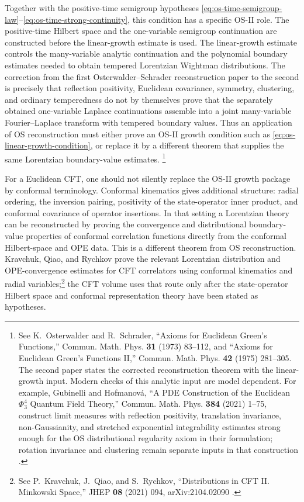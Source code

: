 Together with the positive-time semigroup hypotheses
\eqref{eq:os-time-semigroup-law}--\eqref{eq:os-time-strong-continuity}, this
condition has a specific OS-II role.  The positive-time Hilbert space and the
one-variable semigroup continuation are constructed before the linear-growth
estimate is used.  The linear-growth estimate controls the many-variable
analytic continuation and the polynomial boundary estimates needed to obtain
tempered Lorentzian Wightman distributions.  The correction from the first
Osterwalder--Schrader reconstruction paper to the second is precisely that
reflection positivity, Euclidean covariance, symmetry, clustering, and ordinary
temperedness do not by themselves prove that the separately obtained
one-variable Laplace continuations assemble into a joint many-variable
Fourier--Laplace transform with tempered boundary values.
Thus an application of OS reconstruction must either prove an OS-II growth
condition such as \eqref{eq:os-linear-growth-condition}, or replace it by a
different theorem that supplies the same Lorentzian boundary-value estimates.
\footnote{See K.~Osterwalder and R.~Schrader, ``Axioms for Euclidean Green's
Functions,'' Commun. Math. Phys. \textbf{31} (1973) 83--112, and ``Axioms for
Euclidean Green's Functions II,'' Commun. Math. Phys. \textbf{42} (1975)
281--305.  The second paper states the corrected reconstruction theorem with
the linear-growth input.  Modern checks of this analytic input are model
dependent.  For example, Gubinelli and Hofmanov\'a, ``A PDE Construction of
the Euclidean \(\Phi^4_3\) Quantum Field Theory,'' Commun. Math. Phys.
\textbf{384} (2021) 1--75, construct limit measures with reflection
positivity, translation invariance, non-Gaussianity, and stretched exponential
integrability estimates strong enough for the OS distributional regularity
axiom in their formulation; rotation invariance and clustering remain separate
inputs in that construction \cite{OS1973,OS1975,GubinelliHofmanova2021}.}

\begin{remark}
For a Euclidean CFT, one should not silently replace the OS-II growth package
by conformal terminology.  Conformal kinematics gives additional structure:
radial ordering, the inversion pairing, positivity of the state-operator
inner product, and conformal covariance of operator insertions.  In that
setting a Lorentzian theory can be reconstructed by proving the convergence
and distributional boundary-value properties of conformal correlation
functions directly from the conformal Hilbert-space and OPE data.  This is a
different theorem from OS reconstruction.  Kravchuk, Qiao, and Rychkov prove
the relevant Lorentzian distribution and OPE-convergence estimates for CFT
correlators using conformal kinematics and radial variables;\footnote{See
P.~Kravchuk, J.~Qiao, and S.~Rychkov, ``Distributions in CFT II. Minkowski
Space,'' JHEP \textbf{08} (2021) 094, arXiv:2104.02090
\cite{KravchukQiaoRychkov2021}.} the CFT volume uses
that route only after the state-operator Hilbert space and conformal
representation theory have been stated as hypotheses.
\end{remark}

